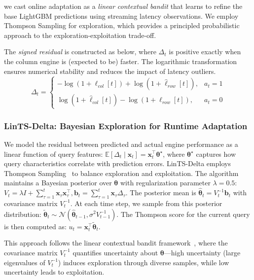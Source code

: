 \documentclass[sigconf, nonacm]{acmart}
\begin{document}
we cast online adaptation as a \emph{linear contextual bandit} \cite{li2010contextual,abbasi2011improved} that learns to refine the base LightGBM predictions using streaming latency observations. We employ Thompson Sampling for exploration, which provides a principled probabilistic approach to the exploration-exploitation trade-off.


The \emph{signed residual} is constructed as below, where $\Delta_t$ is positive exactly when the column engine is (expected to be) faster. The logarithmic transformation ensures numerical stability and reduces the impact of latency outliers.
\begin{equation}\label{eq:residual}
    \Delta_t=
  \begin{cases}
    -\log(1+\ell_{col}[t]) + \log(1+\hat\ell_{row}[t]), & a_t=1\\[4pt]
    \log(1+\hat\ell_{col}[t]) - \log(1+\ell_{row}[t]), & a_t=0
  \end{cases}
\end{equation}
  
\subsubsection{LinTS-Delta: Bayesian Exploration for Runtime Adaptation}

We model the residual between predicted and actual engine performance as a linear function of query features: $\mathbb{E}[\Delta_t\mid\mathbf x_t]=\mathbf x_t^{\top}\boldsymbol\theta^\star$, where $\boldsymbol\theta^\star$ captures how query characteristics correlate with prediction errors.
LinTS-Delta employs Thompson Sampling~\cite{thompson1933likelihood,russo2018tutorial} to balance exploration and exploitation. The algorithm maintains a Bayesian posterior over $\boldsymbol\theta$ with regularization parameter $\lambda = 0.5$:
\(
V_t=\lambda I+\sum_{\tau=1}^{t}\mathbf{x}_{\tau}\mathbf{x}_{\tau}^{\top}, 
\mathbf{b}_t=\sum_{\tau=1}^{t}\mathbf{x}_{\tau}\Delta_{\tau}
\).
The posterior mean is $\hat{\boldsymbol{\theta}}_t = V_t^{-1}\mathbf{b}_t$ with covariance matrix $V_t^{-1}$. At each time step, we sample from this posterior distribution:
\(
\tilde{\boldsymbol{\theta}}_t \sim \mathcal{N}(\hat{\boldsymbol{\theta}}_{t-1}, \sigma^2 V_{t-1}^{-1})
\).
The Thompson score for the current query is then computed as:
\(
u_t = \mathbf x_t^{\top}\tilde{\boldsymbol{\theta}}_t
\).

This approach follows the linear contextual bandit framework~\cite{agrawal2013thompson,lattimore2020bandit}, where the covariance matrix $V_t^{-1}$ quantifies uncertainty about $\boldsymbol\theta$—high uncertainty (large eigenvalues of $V_t^{-1}$) induces exploration through diverse samples, while low uncertainty leads to exploitation.
\end{document}
